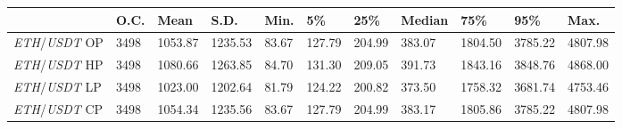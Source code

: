 \begin{tabular}{lllllllllll}
\toprule
 & \textbf{O.C.} & \textbf{Mean} & \textbf{S.D.} & \textbf{Min.} & \textbf{5\%} & \textbf{25\%} & \textbf{Median} & \textbf{75\%} & \textbf{95\%} & \textbf{Max.} \\
\midrule
\emph{ETH}/\emph{USDT} OP & 3498 & 1053.87 & 1235.53 & 83.67 & 127.79 & 204.99 & 383.07 & 1804.50 & 3785.22 & 4807.98 \\
\emph{ETH}/\emph{USDT} HP & 3498 & 1080.66 & 1263.85 & 84.70 & 131.30 & 209.05 & 391.73 & 1843.16 & 3848.76 & 4868.00 \\
\emph{ETH}/\emph{USDT} LP & 3498 & 1023.00 & 1202.64 & 81.79 & 124.22 & 200.82 & 373.50 & 1758.32 & 3681.74 & 4753.46 \\
\emph{ETH}/\emph{USDT} CP & 3498 & 1054.34 & 1235.56 & 83.67 & 127.79 & 204.99 & 383.17 & 1805.86 & 3785.22 & 4807.98 \\
\bottomrule
\end{tabular}
